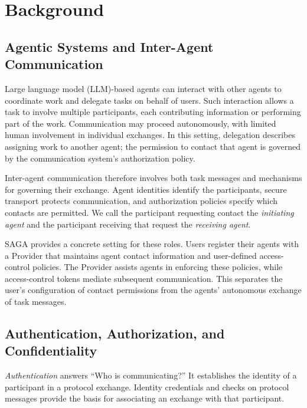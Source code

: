\section{Background}

\subsection{Agentic Systems and Inter-Agent Communication}

Large language model (LLM)-based agents can interact with other agents to
coordinate work and delegate tasks on behalf of users. Such interaction allows
a task to involve multiple participants, each contributing information or
performing part of the work. Communication may proceed autonomously, with
limited human involvement in individual exchanges. In this setting,
delegation describes assigning work to another agent; the permission to
contact that agent is governed by the communication system's authorization
policy.

Inter-agent communication therefore involves both task messages and mechanisms
for governing their exchange. Agent identities identify the participants,
secure transport protects communication, and authorization policies specify
which contacts are permitted. We call the participant requesting contact the
\emph{initiating agent} and the participant receiving that request the
\emph{receiving agent}.

SAGA provides a concrete setting for these roles. Users register their agents
with a Provider that maintains agent contact information and user-defined
access-control policies. The Provider assists agents in enforcing these
policies, while access-control tokens mediate subsequent communication.
This separates the user's configuration of contact permissions from the
agents' autonomous exchange of task messages.

\subsection{Authentication, Authorization, and Confidentiality}

\emph{Authentication} answers ``Who is communicating?'' It establishes the
identity of a participant in a protocol exchange. Identity credentials and
checks on protocol messages provide the basis for associating an exchange
with that participant.

